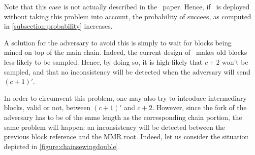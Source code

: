 \documentclass[11pt]{report}
\begin{document}
            Note that this case is not actually described in the \FC\ paper. Hence, if \FC\ is deployed without taking this problem into account, the probability of succees, as computed in \autoref{subsection:probability} increases. 
            
            A solution for the adversary to avoid this is simply to wait for blocks being mined on top of the main chain. Indeed, the current design of \FC\ makes old blocks less-likely to be sampled. Hence, by doing so, it is high-likely that \(c+2\) won't be sampled, and that no inconsistency will be detected when the adversary will send \((c+1)'\).
            
            In order to circumvent this problem, one may also try to introduce intermediary blocks, valid or not, between \((c+1)'\) and \(c+2\). However, since the fork of the adversary has to be of the same length as the corresponding chain portion, the same problem will happen: an inconsistency will be detected between the previous block reference and the MMR root. Indeed, let us consider the situation depicted in \autoref{figure:chainsewingdouble}.
            
\end{document}
